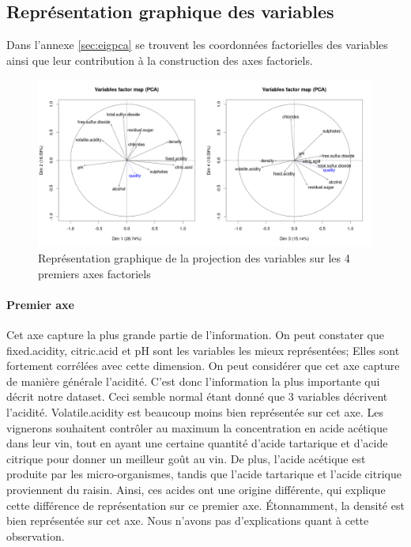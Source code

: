 \documentclass[11pt,a4paper]{article}
\begin{document}
\subsection{Représentation graphique des variables}
Dans l'annexe \ref{sec:eigpca} se trouvent les coordonnées factorielles des variables ainsi que leur contribution à la construction des axes factoriels.

\begin{figure}
\centering
\includegraphics[width=\textwidth]{"pca2"}
\caption{Représentation graphique de la projection des variables sur les 4 premiers axes factoriels}
\end{figure}

\paragraph{Premier axe}Cet axe capture la plus grande partie de l'information. On peut constater que fixed.acidity, citric.acid et pH sont les variables les mieux représentées; Elles sont fortement corrélées avec cette dimension. On peut considérer que cet axe capture de manière générale l'acidité. C'est donc l'information la plus importante qui décrit notre dataset. Ceci semble normal étant donné que 3 variables décrivent l'acidité. Volatile.acidity est beaucoup moins bien représentée sur cet axe. Les vignerons souhaitent contrôler au maximum la concentration en acide acétique dans leur vin, tout en ayant une certaine quantité d'acide tartarique et d'acide citrique pour donner un meilleur goût au vin. De plus, l'acide acétique est produite par les micro-organismes, tandis que l'acide tartarique et l'acide citrique proviennent du raisin. Ainsi, ces acides ont une origine différente, qui explique cette différence de représentation sur ce premier axe. Étonnamment, la densité est bien représentée sur cet axe. Nous n'avons pas d'explications quant à cette observation.
\end{document}
